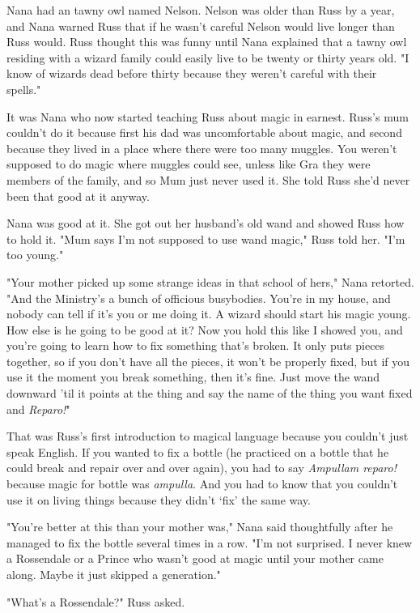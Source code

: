 Nana had an tawny owl named Nelson. Nelson was older than Russ by a year, and Nana warned Russ that if he wasn't careful Nelson would live longer than Russ would. Russ thought this was funny until Nana explained that a tawny owl residing with a wizard family could easily live to be twenty or thirty years old. "I know of wizards dead before thirty because they weren't careful with their spells."

It was Nana who now started teaching Russ about magic in earnest. Russ's mum couldn't do it because first his dad was uncomfortable about magic, and second because they lived in a place where there were too many muggles. You weren't supposed to do magic where muggles could see, unless like Gra they were members of the family, and so Mum just never used it. She told Russ she'd never been that good at it anyway.

Nana was good at it. She got out her husband's old wand and showed Russ how to hold it. "Mum says I'm not supposed to use wand magic," Russ told her. "I'm too young."

"Your mother picked up some strange ideas in that school of hers," Nana retorted. "And the Ministry's a bunch of officious busybodies. You're in my house, and nobody can tell if it's you or me doing it. A wizard should start his magic young. How else is he going to be good at it? Now you hold this like I showed you, and you're going to learn how to fix something that's broken. It only puts pieces together, so if you don't have all the pieces, it won't be properly fixed, but if you use it the moment you break something, then it's fine. Just move the wand downward 'til it points at the thing and say the name of the thing you want fixed and \emph{Reparo!}"

That was Russ's first introduction to magical language because you couldn't just speak English. If you wanted to fix a bottle (he practiced on a bottle that he could break and repair over and over again), you had to say \emph{Ampullam reparo!} because magic for bottle was \emph{ampulla}. And you had to know that you couldn't use it on living things because they didn't `fix' the same way.

"You're better at this than your mother was," Nana said thoughtfully after he managed to fix the bottle several times in a row. "I'm not surprised. I never knew a Rossendale or a Prince who wasn't good at magic until your mother came along. Maybe it just skipped a generation."

"What's a Rossendale?" Russ asked.

